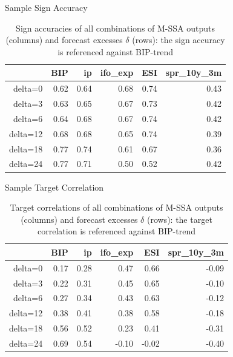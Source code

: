 \documentclass{beamer}
\begin{document}
\begin{frame} {Sample Sign Accuracy}\label{signaac2}
\begin{table}[ht]
\centering
\begin{tabular}{rrrrrr}
  \hline
 & BIP & ip & ifo\_exp & ESI & spr\_10y\_3m \\ 
  \hline
delta=0 & 0.62 & 0.64 & 0.68 & 0.74 & 0.43 \\ 
  delta=3 & 0.63 & 0.65 & 0.67 & 0.73 & 0.42 \\ 
  delta=6 & 0.64 & 0.68 & 0.67 & 0.74 & 0.42 \\ 
  delta=12 & 0.68 & 0.68 & 0.65 & 0.74 & 0.39 \\ 
  delta=18 & 0.77 & 0.74 & 0.61 & 0.67 & 0.36 \\ 
  delta=24 & 0.77 & 0.71 & 0.50 & 0.52 & 0.42 \\ 
   \hline
\end{tabular}
\caption{Sign accuracies of all combinations of M-SSA outputs (columns) and forecast excesses $\delta$ (rows): the sign accuracy is referenced against BIP-trend} 
\label{perf_var1}
\end{table}\end{frame}



\begin{frame} {Sample Target Correlation}\label{sample_target_cor4}
\begin{table}[ht]
\centering
\begin{tabular}{rrrrrr}
  \hline
 & BIP & ip & ifo\_exp & ESI & spr\_10y\_3m \\ 
  \hline
delta=0 & 0.17 & 0.28 & 0.47 & 0.66 & -0.09 \\ 
  delta=3 & 0.22 & 0.31 & 0.45 & 0.65 & -0.10 \\ 
  delta=6 & 0.27 & 0.34 & 0.43 & 0.63 & -0.12 \\ 
  delta=12 & 0.38 & 0.41 & 0.38 & 0.58 & -0.18 \\ 
  delta=18 & 0.56 & 0.52 & 0.23 & 0.41 & -0.31 \\ 
  delta=24 & 0.69 & 0.54 & -0.10 & -0.02 & -0.40 \\ 
   \hline
\end{tabular}
\caption{Target correlations of all combinations of M-SSA outputs (columns) and forecast excesses $\delta$ (rows): the target correlation is referenced against BIP-trend} 
\label{perf_var1}
\end{table}\end{frame}
\end{document}
